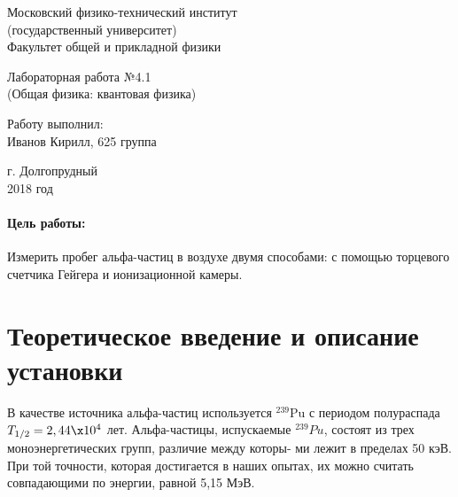 \documentclass[12pt]{kiarticle} %
\begin{document}
	
	\begin{titlepage}
		\begin{center}
			\large 	Московский физико-технический институт \\
			(государственный университет) \\
			Факультет общей и прикладной физики \\
			\vspace{0.2cm}
			
			\vspace{4.5cm}
			Лабораторная работа №4.1  \\ \vspace{0.2cm}
			\large (Общая физика: квантовая физика) \\ \vspace{0.2cm}
			\LARGE \textbf{   }
		\end{center}
		\vspace{2.3cm} \large
		
		\begin{center}
			Работу выполнил: \\
			Иванов Кирилл,
			625 группа
			\vspace{10mm}		
			
		\end{center}
		
		\begin{center} \vspace{60mm}
			г. Долгопрудный \\
			2018 год
		\end{center}
	\end{titlepage}


	\paragraph*{Цель работы:} Измерить пробег альфа-частиц в воздухе двумя способами: с помощью торцевого счетчика Гейгера и ионизационной камеры. 
	
	
	\section{Теоретическое введение и описание установки}
	
	В качестве источника альфа-частиц используется $ ^{239}  $Pu  с периодом полураспада $ T_{1/2} = 2,44 \x 10^4 $ лет. Альфа-частицы, испускаемые $ ^{239} Pu $, состоят из трех моноэнергетических групп, различие между которы-
	ми лежит в пределах 50 кэВ. При той точности, которая достигается
	в наших опытах, их можно считать совпадающими по энергии, равной
	5,15 МэВ.
	
\end{document}
